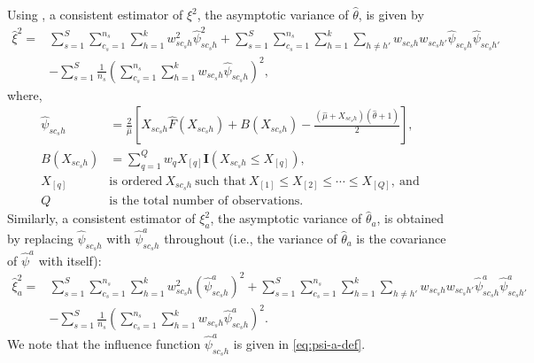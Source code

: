 \documentclass[12pt]{article}
\theoremstyle{plain}
\theoremstyle{definition}
\begin{document}
Using \cite{Bhattacharya2007}, a consistent estimator of $\xi^2$, the asymptotic variance of $\hat\theta$, is given by
\begin{align*}
\hat{\xi}^2=&
\sum_{s=1}^{S}\sum_{c_s=1}^{n_s}\sum_{h=1}^{k}w^2_{sc_sh}\hat{\psi}_{sc_sh}^2 + 
\sum_{s=1}^{S}\sum_{c_s=1}^{n_s}\sum_{h=1}^{k}\sum_{h\neq h'}w_{sc_sh}w_{sc_sh'}\hat{\psi}_{sc_sh}\hat{\psi}_{sc_sh'} \\
&-\sum_{s=1}^{S}\frac{1}{n_s}\left(\sum_{c_s=1}^{n_s}\sum_{h=1}^{k}w_{sc_sh}\hat{\psi}_{sc_sh}\right)^2,
\end{align*}
where,
\begin{align*}
    \hat{\psi}_{sc_sh} &= \frac{2}{\hat{\mu}}\left[X_{sc_sh}\hat{F}(X_{sc_sh}) + B(X_{sc_sh}) - \frac{(\hat{\mu} + X_{sc_sh})(\hat{\theta}+1)}{2}\right],\\
    B(X_{sc_sh}) &= \sum_{q=1}^{Q}w_q X_{[q]}\bm{I}(X_{sc_sh}\leq X_{[q]}),\\
    X_{[q]}\ & \text{is ordered}\ X_{sc_sh}\ \text{such that}\ X_{[1]}\leq X_{[2]}\leq\cdots\leq X_{[Q]},\ \text{and}\\
    Q\ & \text{is the total number of observations.}
\end{align*}
Similarly, a consistent estimator of $\xi_a^2$, the asymptotic variance of $\hat\theta_a$, is
obtained by replacing $\hat\psi_{sc_sh}$ with $\hat\psi^a_{sc_sh}$ throughout (i.e., the variance
of $\hat\theta_a$ is the covariance of $\hat\psi^a$ with itself):
\begin{align*}
\hat{\xi}_a^2=&
\sum_{s=1}^{S}\sum_{c_s=1}^{n_s}\sum_{h=1}^{k}w^2_{sc_sh}\left(\hat{\psi}_{sc_sh}^a\right)^2 + 
\sum_{s=1}^{S}\sum_{c_s=1}^{n_s}\sum_{h=1}^{k}\sum_{h\neq h'}w_{sc_sh}w_{sc_sh'}\hat{\psi}_{sc_sh}^a\hat{\psi}_{sc_sh'}^a \\
&-\sum_{s=1}^{S}\frac{1}{n_s}\left(\sum_{c_s=1}^{n_s}\sum_{h=1}^{k}w_{sc_sh}\hat{\psi}_{sc_sh}^a\right)^2.
\end{align*}
We note that the influence function $\hat{\psi}_{sc_sh}^a$ is given in \eqref{eq:psi-a-def}.
\end{document}
